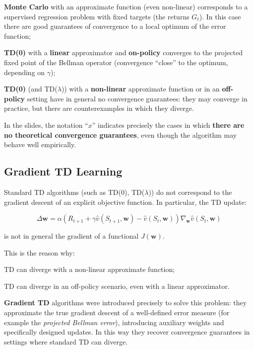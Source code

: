 \begin{compactitemize}
    \item \textbf{Monte Carlo} with an approximate function (even non-linear) corresponds to a supervised regression problem with fixed targets (the returns $G_t$). In this case there are good guarantees of convergence to a local optimum of the error function;
    \item \textbf{TD(0)} with a \textbf{linear} approximator and \textbf{on-policy} converges to the projected fixed point of the Bellman operator (convergence ``close'' to the optimum, depending on $\gamma$);
    \item \textbf{TD(0)} (and TD($\lambda$)) with a \textbf{non-linear} approximate function or in an \textbf{off-policy} setting have in general no convergence guarantees: they may converge in practice, but there are counterexamples in which they diverge.
\end{compactitemize}

In the slides, the notation ``$x$'' indicates precisely the cases in which \textbf{there are no theoretical convergence guarantees}, even though the algorithm may behave well empirically.

\subsection{Gradient TD Learning}

Standard TD algorithms (such as TD(0), TD($\lambda$)) do not correspond to the gradient descent of an explicit objective function.
In particular, the TD update:

\[
\Delta \mathbf{w}
=
\alpha
\left( R_{t+1} + \gamma \hat{v}(S_{t+1},\mathbf{w}) - \hat{v}(S_t,\mathbf{w}) \right)
\nabla_{\mathbf{w}} \hat{v}(S_t,\mathbf{w})
\]

is not in general the gradient of a functional $J(\mathbf{w})$.

This is the reason why:

\begin{compactitemize}
    \item TD can diverge with a non-linear approximate function;
    \item TD can diverge in an off-policy scenario, even with a linear approximator.
\end{compactitemize}

\textbf{Gradient TD} algorithms were introduced precisely to solve this problem:
they approximate the true gradient descent of a well-defined error measure (for example the \emph{projected Bellman error}), introducing auxiliary weights and specifically designed updates.
In this way they recover convergence guarantees in settings where standard TD can diverge.

